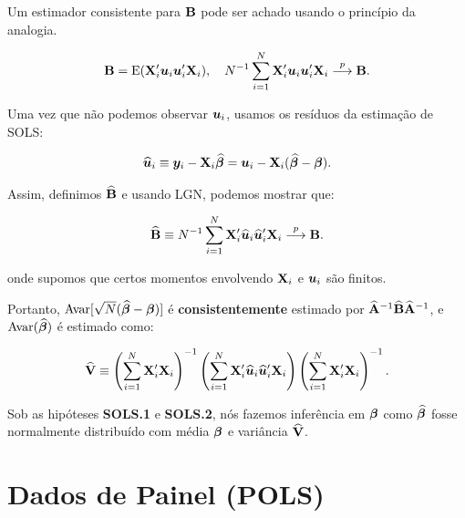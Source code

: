 \documentclass[11pt, oneside, a4paper, article]{article}
\numberwithin{equation}{section}
\begin{document}
Um estimador consistente para $\mathbf{B}$ pode ser achado usando o princípio da analogia.

\vspace{-1 em}
\begin{align*}
\mathbf{B} = \text{E}(\mathbf{X}_{i}' \boldsymbol{u}_{i} \boldsymbol{u}_{i}' \mathbf{X}_{i}), 
\quad
N^{-1}\sum_{i=1}^{N} \mathbf{X}_{i}' \boldsymbol{u}_{i} \boldsymbol{u}_{i}' \mathbf{X}_{i}  \overset{p}{\longrightarrow}  \mathbf{B}.
\end{align*}

Uma vez que não podemos observar $\boldsymbol{u}_{i}$, usamos os resíduos da estimação de SOLS:

\vspace{-1 em}
\begin{align*}
\widehat{\boldsymbol{u}}_{i} \equiv \boldsymbol{y}_{i} - \mathbf{X}_{i} \widehat{\boldsymbol{\beta}} 
=
\boldsymbol{u}_{i} - \mathbf{X}_{i} (\widehat{\boldsymbol{\beta}} - \boldsymbol{\beta}).
\end{align*}

Assim, definimos $\widehat{\mathbf{B}}$ e usando LGN, podemos mostrar que:

\vspace{-1 em}
\begin{align*}
\widehat{\mathbf{B}} \equiv N^{-1}\sum_{i=1}^{N} \mathbf{X}_{i}' \widehat{\boldsymbol{u}}_{i} \widehat{\boldsymbol{u}}_{i}' \mathbf{X}_{i} 
 \overset{p}{\longrightarrow}  \mathbf{B}.
\end{align*}

\noindent
onde supomos que certos momentos envolvendo $\mathbf{X}_{i}$ e $\boldsymbol{u}_{i}$ são finitos.

Portanto, $\text{Avar}[\sqrt{N}(\widehat{\boldsymbol{\beta}} - \boldsymbol{\beta})]$ é \textbf{consistentemente} estimado por $\widehat{\mathbf{A}}^{-1} \widehat{\mathbf{B}} \widehat{\mathbf{A}}^{-1}$, e $\text{Avar}(\widehat{\boldsymbol{\beta}})$ é estimado como:

\vspace{-1 em}
\begin{align*}
\widehat{\mathbf{V}} \equiv 
\left( \sum_{i=1}^{N} \mathbf{X}_{i}' \mathbf{X}_{i}  \right)^{-1}
\left( \sum_{i=1}^{N} \mathbf{X}_{i}' \widehat{\boldsymbol{u}}_{i} \widehat{\boldsymbol{u}}_{i}'  \mathbf{X}_{i}  \right)
\left( \sum_{i=1}^{N} \mathbf{X}_{i}' \mathbf{X}_{i}  \right)^{-1}.
\end{align*}

Sob as hipóteses \textbf{SOLS.1} e \textbf{SOLS.2}, nós fazemos inferência em $\boldsymbol{\beta}$ como $\widehat{\boldsymbol{\beta}}$ fosse normalmente distribuído com média $\boldsymbol{\beta}$ e variância $\widehat{\mathbf{V}}$.


\clearpage
\section{Dados de Painel (POLS)}
\noindent
\citet[Sec.7.8 -- The Linear Panel Data Model, Revisited. p.169]{wool-2010} 
\end{document}
